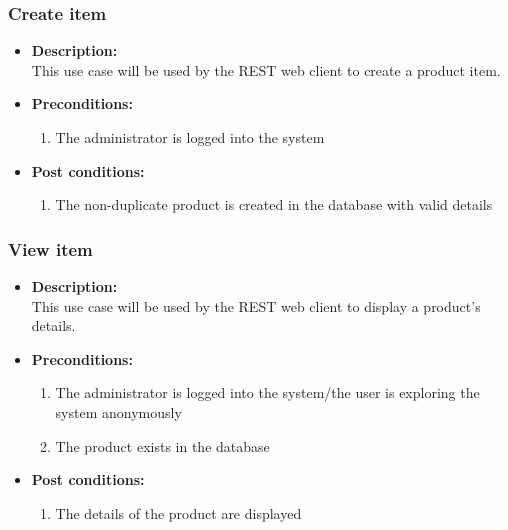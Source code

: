 \documentclass[a4paper,10pt]{article}
\begin{document}
\subsubsection{Create item}
\begin{itemize}
	\item \textbf {Description:}\\
	This use case will be used by the REST web client to create a product item.
	\item \textbf {Preconditions:}
		\begin{enumerate}
			\item The administrator is logged into the system
		\end{enumerate}
	\item \textbf {Post conditions:}
		\begin{enumerate}
			\item The non-duplicate product is created in the database with valid details
		\end{enumerate}
\end{itemize}
\subsubsection{View item}
\begin{itemize}
	\item \textbf {Description:}\\
	This use case will be used by the REST web client to display a product’s details.
	\item \textbf {Preconditions:}
		\begin{enumerate}
			\item The administrator is logged into the system/the user is exploring the system anonymously
			\item The product exists in the database
		\end{enumerate}
	\item \textbf {Post conditions:}
		\begin{enumerate}
			\item The details of the product are displayed
		\end{enumerate}
\end{itemize}
\end{document}
